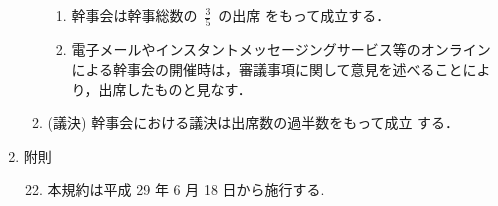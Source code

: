 \begin{enumerate}
\begin{enumerate}
\begin{enumerate}
    \item 幹事会は幹事総数の~\(\displaystyle{\frac{3}{5}}\)~の出席
をもって成立する．\\
    \item 電子メールやインスタントメッセージングサービス等のオンラインによる幹事会の開催時は，審議事項に関して意見を述べることにより，出席したものと見なす．
\end{enumerate}
%
\item    (議決) 幹事会における議決は出席数の過半数をもって成立
                する．\\
%
%
\end{enumerate}
%
\item	附則\\
%
\begin{enumerate}
\setcounter{enumii}{21}
\item	本規約は平成 29 年  6 月 18 日から施行する. \\
%
%
\end{enumerate}
%
\end{enumerate}
%

